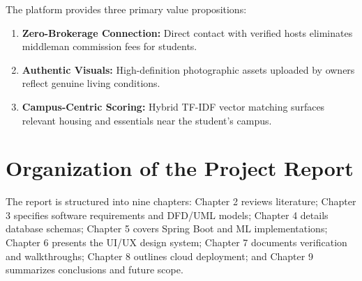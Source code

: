The platform provides three primary value propositions:
\begin{enumerate}
    \item \textbf{Zero-Brokerage Connection:} Direct contact with verified hosts eliminates middleman commission fees for students.
    \item \textbf{Authentic Visuals:} High-definition photographic assets uploaded by owners reflect genuine living conditions.
    \item \textbf{Campus-Centric Scoring:} Hybrid TF-IDF vector matching surfaces relevant housing and essentials near the student's campus.
\end{enumerate}

\section{Organization of the Project Report}
The report is structured into nine chapters: Chapter 2 reviews literature; Chapter 3 specifies software requirements and DFD/UML models; Chapter 4 details database schemas; Chapter 5 covers Spring Boot and ML implementations; Chapter 6 presents the UI/UX design system; Chapter 7 documents verification and walkthroughs; Chapter 8 outlines cloud deployment; and Chapter 9 summarizes conclusions and future scope.